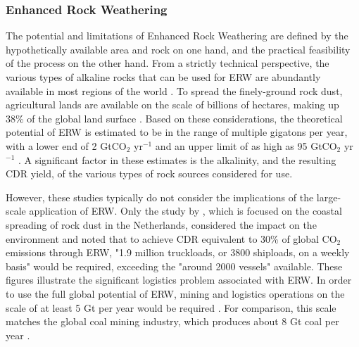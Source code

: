 \subsubsection{Enhanced Rock Weathering}
The potential and limitations of Enhanced Rock Weathering are defined by the hypothetically available area and rock on one hand, and the practical feasibility of the process on the other hand. From a strictly technical perspective, the various types of alkaline rocks that can be used for ERW are abundantly available in most regions of the world \parencite{hangx_coastal_2009, strefler_potential_2018}. To spread the finely-ground rock dust, agricultural lands are available on the scale of billions of hectares, making up 38\% of the global land surface \parencite{almaraz_methods_2022}. Based on these considerations, the theoretical potential of ERW is estimated to be in the range of multiple gigatons per year, with a lower end of 2 GtCO$_2$ yr$^{-1}$ and an upper limit of as high as 95 GtCO$_2$ yr$^{-1}$ \parencite{almaraz_methods_2022, goll_potential_2021, strefler_potential_2018, fuss_negative_2018}. A significant factor in these estimates is the alkalinity, and the resulting CDR yield, of the various types of rock sources considered for use.\vspace{2mm}

However, these studies typically do not consider the implications of the large-scale application of ERW. Only the study by \textcite{hangx_coastal_2009}, which is focused on the coastal spreading of rock dust in the Netherlands, considered the impact on the environment and noted that to achieve CDR equivalent to 30\% of global CO$_2$ emissions through ERW, "1.9 million truckloads, or 3800 shiploads, on a weekly basis" would be required, exceeding the "around 2000 vessels" available. These figures illustrate the significant logistics problem associated with ERW. In order to use the full global potential of ERW, mining and logistics operations on the scale of at least 5 Gt per year would be required \parencite{hangx_coastal_2009}. For comparison, this scale matches the global coal mining industry, which produces about 8 Gt coal per year \parencite{iea_global_2022}.

